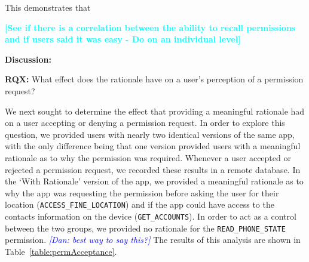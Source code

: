 \documentclass{sig-alternate-05-2015}
\newcommand{\todo}[1]{\textcolor{cyan}{\textbf{[#1]}}}
\newcommand{\dan}[1]{\textcolor{blue}{{\it [Dan: #1]}}}
\begin{document}
This demonstrates that %







\todo{See if there is a correlation between the ability to recall permissions and if users said it was easy - Do on an individual level}


\textbf{Discussion:}





\textbf{RQX:} What effect does the rationale have on a user's perception of a permission request?



We next sought to determine the effect that providing a meaningful rationale had on a user accepting or denying a permission request. In order to explore this question, we provided users with nearly two identical versions of the same app, with the only difference being that one version provided users with a meaningful rationale as to why the permission was required. Whenever a user accepted or rejected a permission request, we recorded these results in a remote database. In the `With Rationale' version of the app, we provided a meaningful rationale as to why the app was requesting the permission before asking the user for their location (\texttt{ACCESS\_FINE\_LOCATION}) and if the app could have access to the contacts information on the device (\texttt{GET\_ACCOUNTS}). In order to act as a control between the two groups, we provided no rationale for the \texttt{READ\_PHONE\_STATE} permission. \dan{best way to say this?} The results of this analysis are shown in Table~\ref{table:permAcceptance}.

\end{document}
